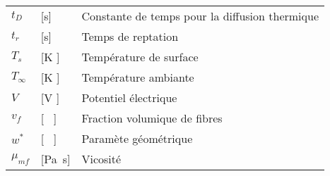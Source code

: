 \begin{longtable}{l p{2.5cm} p{4in}}
	$t_D$            & [\si{\second}]                                      & Constante de temps pour la diffusion thermique               \\
	$t_r$			& [\si{\second}]  & Temps de reptation \\
	$T_s$            & [\si{\kelvin} ]                                     & Température de surface                                       \\
	$T_{\infty}$     & [\si{\kelvin} ]                                     & Température ambiante                                         \\
	$V$              & [\si{\volt} ]                                       & Potentiel électrique                                         \\
	$v_f$            & [ \ ]                                               & Fraction volumique de fibres                                 \\
	$w^*$            & [ \ ]                                               & Paramète géométrique \\
	$\mu_{mf}$ 	& [\si{\pascal\second}]  & Vicosité 
\end{longtable}
